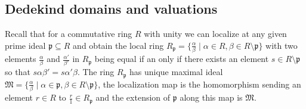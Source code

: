 \documentclass{article}
\DeclareMathOperator{\Frac}{Frac}
\newtheorem{definition}{Definition}[section]
\newcommand{\mfrak}[1]{\mathfrak{#1}}
\numberwithin{equation}{section}
\begin{document}
\subsection{Dedekind domains and valuations}





Recall that for a commutative ring $R$ with unity we can localize at any given prime ideal $\mfrak p \subseteq R$ and obtain the local ring $R_\mfrak p = \{\frac{\alpha}{\beta} \mid \alpha \in R, \beta \in R \setminus \mfrak p \}$ with two elements $\frac{\alpha}{\beta}$ and  $\frac{\alpha'}{\beta'}$ in $R_\mfrak p$ being equal if an only if there exists an element $s \in R \setminus \mfrak p$ so that $s\alpha \beta' = s\alpha' \beta$. The ring $R_\mfrak p$ has unique maximal ideal $\mfrak M =  \{\frac{\alpha}{\beta} \mid \alpha \in \mfrak p, \beta \in R\setminus \mfrak p \}$, the localization map is the homomorphism sending an element $r \in R$ to $\frac{r}{1} \in R_\mfrak p$ and the extension of $\mfrak p$ along this map is $\mfrak M$.
\end{document}
